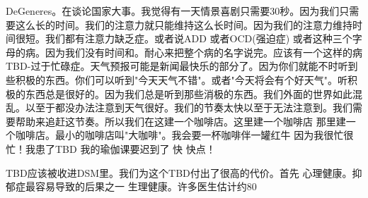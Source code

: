 DeGeneres。在谈论国家大事。我觉得有一天情景喜剧只需要30秒。因为我们只需要这么长的时间。我们的注意力就只能维持这么长时间。因为我们的注意力维持时间很短。我们都有注意力缺乏症。或者说ADD 或者OCD(强迫症) 或者这种三个字母的病。因为我们没有时间和。耐心来把整个病的名字说完。应该有一个这样的病 TBD-过于忙碌症。天气预报可能是新闻最快乐的部分了。因为你们就能不时听到些积极的东西。你们可以听到"今天天气不错"。或者"今天将会有个好天气"。听积极的东西总是很好的。因为我们总是听到那些消极的东西。我们外面的世界如此混乱。以至于都没办法注意到天气很好。我们的节奏太快以至于无法注意到。我们需要帮助来追赶这节奏。所以我们在这建一个咖啡店。这里建一个咖啡店 那里建一个咖啡店。最小的咖啡店叫"大咖啡"。我会要一杯咖啡伴一罐红牛 因为我很忙很忙！我患了TBD 我的瑜伽课要迟到了 快 快点！ 

TBD应该被收进DSM里。我们为这个TBD付出了很高的代价。首先 心理健康。抑郁症最容易导致的后果之一 生理健康。许多医生估计约80%
